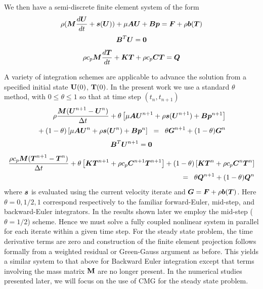 We then  have a semi-discrete finite element system
of the form
\begin{equation}
  \rho (\mbox{\boldmath $M$} \frac{d \mbox{\boldmath $U$}}{dt}+ \mbox{\boldmath $s$}(\mbox{\boldmath $U$})) +
  \mu \mbox{\boldmath $A$} \mbox{\boldmath $U$} +
  \mbox{\boldmath $B$} \mbox{\boldmath $p$} = \mbox{\boldmath $F$} + \rho\mbox{\boldmath $b$}(\mbox{\boldmath $T$})
  \label{momentum_algb_eqn}
\end{equation}
\begin{equation}
  \mbox{\boldmath $B$}^T \mbox{\boldmath $U$} = \mathbf{0}
  \label{continuity_algb_eqn}
\end{equation}
\begin{equation}
  \rho c_p \mbox{\boldmath $M$} \frac{d\mbox{\boldmath $T$}}{dt} +
  \mbox{\boldmath $K$} \mbox{\boldmath $T$} + \rho c_p \mbox{\boldmath $C$} \mbox{\boldmath $T$} = \mbox{\boldmath $Q$}
  \label{thermal_algb_eqn}
\end{equation}

A variety of integration schemes are applicable to advance the
solution from a specified initial state ${\bf U}(0)$, ${\bf T}(0)$. In
the present work we use a standard $\theta$ method, with
$0 \leq \theta \leq 1$ so that at time step $(t_n,t_{n+1})$
\begin{eqnarray}
    \rho \frac{{\bfM} ({\bfU}^{n+1} - {\bfU}^n)} {\Delta t}
    + \theta \left[ \mu \bfA \bfU^{n+1} + \rho \bfs(\bfU^{n+1}) +
    \bfB \bfp^{n+1} \right]  \nonumber \\ \vbox{\vglue10pt}
  + (1 - \theta) \left[
    \mu \bfA \bfU^{n} + \rho \bfs(\bfU^{n}) +
    \bfB \bfp^{n} \right]\;\;
  =\;\; \theta \bfG^{n+1} + (1 - \theta) \bfG^n
  \label{momentum_algb_theta_eqn}
\end{eqnarray}
\begin{equation}
  \mbox{\boldmath $B$}^T \mbox{\boldmath $U$}^{n+1} = \mathbf{0}
  \label{continuity_algb_theta_eqn}
\end{equation}
\begin{eqnarray}
  \frac{\rho c_p \mbox{\boldmath $M$} (\mbox{\boldmath $T$}^{n+1} - \mbox{\boldmath $T$}^n)} {\Delta t}
  + \theta \left[
    \mbox{\boldmath $K$} \mbox{\boldmath $T$}^{n+1} + \rho c_p \mbox{\boldmath $C$}^{n+1} \mbox{\boldmath $T$}^{n+1}
  \right]
  + (1 - \theta) \left[
    \mbox{\boldmath $K$} \mbox{\boldmath $T$}^{n} + \rho c_p \mbox{\boldmath $C$}^{n} \mbox{\boldmath $T$}^{n}
  \right]
  \nonumber \\
  \;\; =\;\; \theta \mbox{\boldmath $Q$}^{n+1} + (1 - \theta)\mbox{\boldmath $Q$}^n
  \label{thermal_algb_theta_eqn}
\end{eqnarray}
\noindent
where $\mbox{\boldmath $s$}$ is evaluated using the current velocity iterate and $\mbox{\boldmath $G$} =
\mbox{\boldmath $F$} + \rho \mbox{\boldmath $b$}(\mbox{\boldmath $T$})$. Here $\theta = 0, 1/2, 1$ correspond
respectively to the familiar forward-Euler, mid-step, and
backward-Euler  integrators. In the results shown later we employ the
mid-step ($\theta = 1/2$) scheme. Hence we must solve a fully coupled
nonlinear system in parallel for each iterate within a given time step.
For the steady state problem, the time derivative terms are zero and
construction of the finite element projection follows formally from a
weighted residual or Green-Gauss argument  as before. This yields a similar
system to that above for Backward Euler integration except that terms
involving the mass matrix ${\bf M}$ are no longer present. In the numerical
studies presented later, we will focus on the use of CMG for the steady
state problem.

